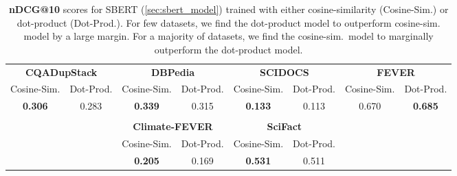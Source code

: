 \documentclass[11pt]{article}
\begin{document}
\begin{table*}[htb!]
{{\begin{tabular}{c c c c c c c c}
        \multicolumn{2}{c}{\textbf{CQADupStack}} &
        \multicolumn{2}{c}{\textbf{DBPedia}} &
        \multicolumn{2}{c}{\textbf{SCIDOCS}} &
        \multicolumn{2}{c}{\textbf{FEVER}} \\
        \cmidrule(lr){1-2}
        \cmidrule(lr){3-4}
        \cmidrule(lr){5-6}
        \cmidrule(lr){7-8}
        Cosine-Sim. & Dot-Prod. & Cosine-Sim. & Dot-Prod. & Cosine-Sim. & Dot-Prod. & Cosine-Sim. & Dot-Prod. \\ 
        \cmidrule(lr){1-1}\cmidrule(lr){2-2}\cmidrule(lr){3-3}\cmidrule(lr){4-4}\cmidrule(lr){5-5}\cmidrule(lr){6-6}\cmidrule(lr){7-7}\cmidrule(lr){8-8}
        \textbf{0.306} & 0.283 & \textbf{0.339} & 0.315 & \textbf{0.133} & 0.113 & 0.670 & \textbf{0.685} \\ \\
        
        \multicolumn{2}{c}{} &
        \multicolumn{2}{c}{\textbf{Climate-FEVER}} &
        \multicolumn{2}{c}{\textbf{SciFact}} &
        \multicolumn{2}{c}{} \\

        \cmidrule(lr){3-4}
        \cmidrule(lr){5-6}
         &  & Cosine-Sim. & Dot-Prod. & Cosine-Sim. & Dot-Prod. & & \\ 
        \cmidrule(lr){3-3}\cmidrule(lr){4-4}\cmidrule(lr){5-5}\cmidrule(lr){6-6}
        &  & \textbf{0.205} & 0.169 &  \textbf{0.531} & 0.511 & & \\
        
    \end{tabular}}}
    \caption{\textbf{nDCG@10} scores for SBERT (\autoref{sec:sbert_model}) trained with either cosine-similarity (Cosine-Sim.) or dot-product (Dot-Prod.). For few datasets, we find the dot-product model to outperform cosine-sim. model by a large margin. For a majority of datasets, we find the cosine-sim.~model to marginally outperform the dot-product model.}
    \label{tab:dot-vs-cosine}
    \vspace*{-\baselineskip}
\end{table*}
\end{document}
